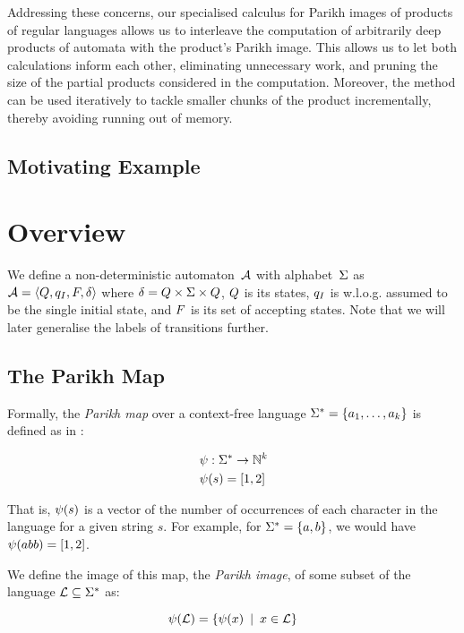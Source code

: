 \documentclass[acmsmall,review,anonymous]{acmart}\settopmatter{printfolios=true,printccs=false,printacmref=true}
\theoremstyle{definition}
\begin{document}
Addressing these concerns, our specialised calculus for Parikh images of
products of regular languages allows us to interleave the computation of
arbitrarily deep products of automata with the product's Parikh image. This
allows us to let both calculations inform each other, eliminating unnecessary
work, and pruning the size of the partial products considered in the
computation. Moreover, the method can be used iteratively to tackle smaller
chunks of the product incrementally, thereby avoiding running out of memory.

\subsection{Motivating Example}


\section{Overview}

We define a non-deterministic automaton~$\Automaton$ with alphabet~$\Alphabet$
as $\Automaton = \AutomatonTuple$ where $\Transitions = \States \times \Alphabet
\times \States$, $\States$ is its states, $\InitialState$ is w.l.o.g. assumed to
be the single initial state, and $\AcceptingStates$ is its set of accepting
states. Note that we will later generalise the labels of transitions further.

\subsection{The Parikh Map}
Formally, the \textit{Parikh map} over a context-free language $\Strings=
\left\{a_1, \ldots, a_k \right\}$ is defined as in \cite{kozen}:

$$
\begin{aligned}
& \ParikhMap: \MapFromTo{\Strings}{\natural^k} \\
& \ParikhMap(s) = \VectorLiteral{\#a_1(s), \#a_2(s), \ldots, \#a_k(s)}
\end{aligned}
$$

That is, $\ParikhMap(s)$ is a vector of the number of occurrences of each
character in the language for a given string $s$. For example, for  $\Strings =
\Set{a, b}$, we would have $\ParikhMap(abb) = \VectorLiteral{1, 2}$.

We define the image of this map, the \textit{Parikh image}, of some subset of
the language $\Language \subseteq \Strings$ as:

\[
\ParikhMap(\Language) = \Set{\ParikhMap(x) \SuchThat x \in \Language}
\]
\end{document}
